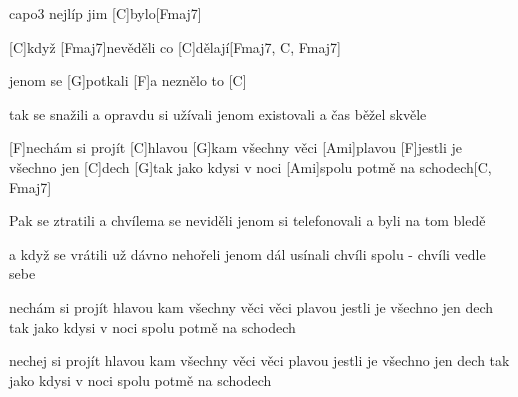 \hfill capo3
nejlíp jim [C]bylo[Fmaj7]

[C]když [Fmaj7]nevěděli co [C]dělají[Fmaj7, C, Fmaj7]

jenom se [G]potkali
[F]a neznělo to [C]

tak se snažili
a opravdu si užívali
jenom existovali
a čas běžel skvěle


[F]nechám si projít [C]hlavou
[G]kam všechny věci [Ami]plavou
[F]jestli je všechno jen [C]dech
[G]tak jako kdysi v noci
[Ami]spolu potmě na schodech[C, Fmaj7]

\slpc
Pak se ztratili
a chvílema se neviděli
jenom si telefonovali
a byli na tom bledě

a když se vrátili
už dávno nehořeli
jenom dál usínali
chvíli spolu - chvíli vedle sebe

nechám si projít hlavou
kam všechny věci věci plavou
jestli je všechno jen dech
tak jako kdysi v noci
spolu potmě na schodech

nechej si projít hlavou
kam všechny věci věci plavou
jestli je všechno jen dech
tak jako kdysi v noci
spolu potmě na schodech



